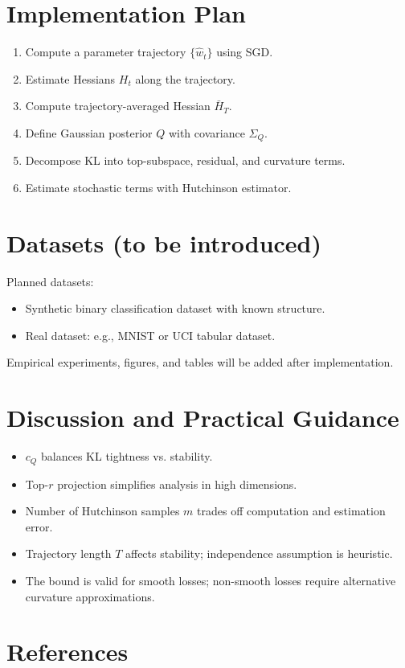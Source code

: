 \documentclass[11pt]{article}
\begin{document}
\section{Implementation Plan}
\begin{enumerate}[noitemsep]
\item Compute a parameter trajectory $\{\hat w_t\}$ using SGD.
\item Estimate Hessians $H_t$ along the trajectory.
\item Compute trajectory-averaged Hessian $\bar H_T$.
\item Define Gaussian posterior $Q$ with covariance $\Sigma_Q$.
\item Decompose KL into top-subspace, residual, and curvature terms.
\item Estimate stochastic terms with Hutchinson estimator.
\end{enumerate}

\section{Datasets (to be introduced)}
Planned datasets:
\begin{itemize}[noitemsep]
\item Synthetic binary classification dataset with known structure.
\item Real dataset: e.g., MNIST or UCI tabular dataset.
\end{itemize}
Empirical experiments, figures, and tables will be added after implementation.

\section{Discussion and Practical Guidance}
\begin{itemize}[noitemsep]
\item $c_Q$ balances KL tightness vs. stability.
\item Top-$r$ projection simplifies analysis in high dimensions.
\item Number of Hutchinson samples $m$ trades off computation and estimation error.
\item Trajectory length $T$ affects stability; independence assumption is heuristic.
\item The bound is valid for smooth losses; non-smooth losses require alternative curvature approximations.
\end{itemize}

\section{References}


\end{document}
